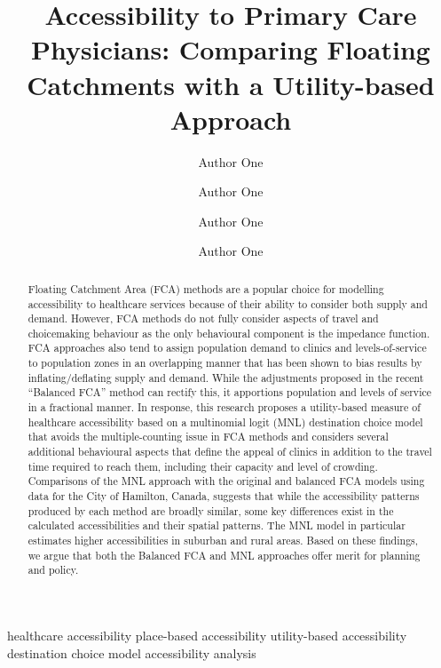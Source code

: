 \documentclass[]{elsarticle} %
\begin{document}
\begin{frontmatter}

  \title{Accessibility to Primary Care Physicians: Comparing Floating
Catchments with a Utility-based Approach}
    \author[Some University]{Author One}
    \author[Some University]{Author One}
    \author[Some University]{Author One}
    \author[Some University]{Author One}
      \address[Some University]{Address}
  
  \begin{abstract}
  Floating Catchment Area (FCA) methods are a popular choice for
  modelling accessibility to healthcare services because of their
  ability to consider both supply and demand. However, FCA methods do
  not fully consider aspects of travel and choicemaking behaviour as the
  only behavioural component is the impedance function. FCA approaches
  also tend to assign population demand to clinics and levels-of-service
  to population zones in an overlapping manner that has been shown to
  bias results by inflating/deflating supply and demand. While the
  adjustments proposed in the recent ``Balanced FCA'' method can rectify
  this, it apportions population and levels of service in a fractional
  manner. In response, this research proposes a utility-based measure of
  healthcare accessibility based on a multinomial logit (MNL)
  destination choice model that avoids the multiple-counting issue in
  FCA methods and considers several additional behavioural aspects that
  define the appeal of clinics in addition to the travel time required
  to reach them, including their capacity and level of crowding.
  Comparisons of the MNL approach with the original and balanced FCA
  models using data for the City of Hamilton, Canada, suggests that
  while the accessibility patterns produced by each method are broadly
  similar, some key differences exist in the calculated accessibilities
  and their spatial patterns. The MNL model in particular estimates
  higher accessibilities in suburban and rural areas. Based on these
  findings, we argue that both the Balanced FCA and MNL approaches offer
  merit for planning and policy.
  \end{abstract}
   \begin{keyword} healthcare accessibility place-based
accessibility utility-based accessibility destination choice
model accessibility analysis\end{keyword}
 \end{frontmatter}
\end{document}
